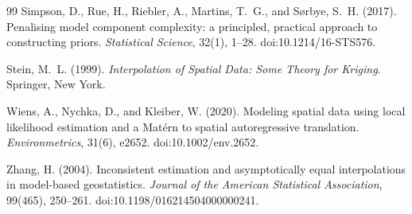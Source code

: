 \documentclass[11pt]{article}
\numberwithin{table}{section}
\numberwithin{figure}{section}
\begin{document}
{\begin{thebibliography}{99}
Simpson, D., Rue, H., Riebler, A., Martins, T.~G., and S{\o}rbye, S.~H. (2017).
Penalising model component complexity: a principled, practical approach to constructing priors.
\emph{Statistical Science}, 32(1), 1--28.
doi:10.1214/16-STS576.

Stein, M.~L. (1999).
\emph{Interpolation of Spatial Data: Some Theory for Kriging}.
Springer, New York.

Wiens, A., Nychka, D., and Kleiber, W. (2020).
Modeling spatial data using local likelihood estimation and a Mat\'ern to spatial autoregressive translation.
\emph{Environmetrics}, 31(6), e2652.
doi:10.1002/env.2652.

Zhang, H. (2004).
Inconsistent estimation and asymptotically equal interpolations in model-based geostatistics.
\emph{Journal of the American Statistical Association}, 99(465), 250--261.
doi:10.1198/016214504000000241.

\end{thebibliography}
}
\end{document}
